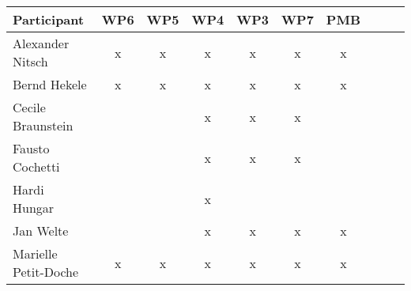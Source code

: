 \documentclass[a4paper, 11pt]{article}
\begin{document}
\begin{tabular}{|l|c|c|c|c|c|c||c|c|c|}
\hline
\textbf{Participant} & \textbf{WP6} &  \textbf{WP5} & \textbf{WP4}&  \textbf{WP3} & \textbf{WP7}&  \textbf{PMB} \\\hline
Alexander Nitsch     & x & x & x & x & x & x \\\hline  
Bernd Hekele         & x & x & x & x & x & x \\\hline
Cecile Braunstein    &   &   & x & x & x &   \\\hline
Fausto Cochetti      &   &   & x & x & x &   \\\hline
Hardi Hungar         &   &   & x &   &   &   \\\hline
Jan Welte            &   &   & x & x & x & x \\\hline
Marielle Petit-Doche & x & x & x & x & x & x \\\hline

\end{tabular}
\end{document}
